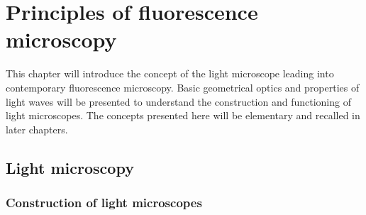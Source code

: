 
\ifpdf
    \graphicspath{{Chapters/principles/Figs/Raster/}{Chapters/principles/Figs/PDF/}{Chapters/principles/Figs/}}
\else
    \graphicspath{{Chapters/principles/Figs/Vector/}{Chapters/principles/Figs/}}
\fi

\chapter{Principles of fluorescence microscopy}

This chapter will introduce the concept of the light microscope leading into contemporary fluorescence microscopy.
Basic geometrical optics and properties of light waves will be presented to understand the construction and functioning of light microscopes.
The concepts presented here will be elementary and recalled in later chapters.
\pagebreak
\section{Light microscopy}

\subsection{Construction of light microscopes}


